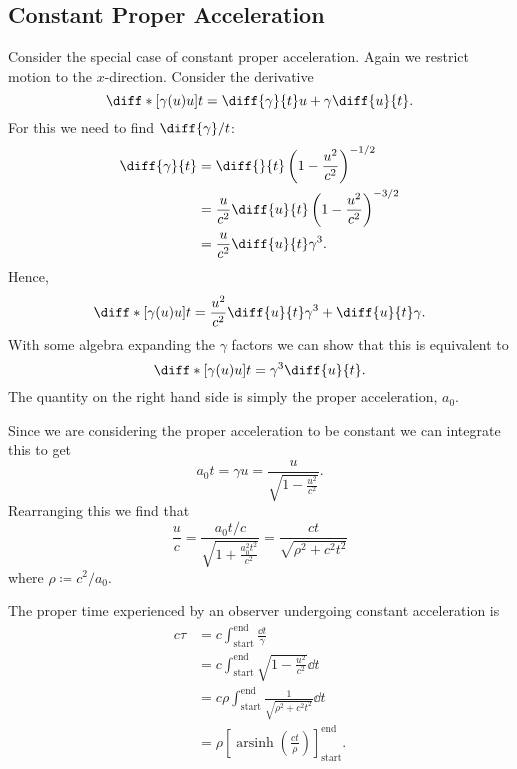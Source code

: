 \documentclass[fleqn]{NotesClass}
\DeclareMathOperator{\arsinh}{arsinh}
\begin{document}
    \subsection{Constant Proper Acceleration}
    Consider the special case of constant proper acceleration.
    Again we restrict motion to the \(x\)-direction.
    Consider the derivative
    \begin{equation}
        \diff*{[\gamma(u)u]}{t} = \diff{\gamma}{t}u + \gamma\diff{u}{t}.
    \end{equation}
    For this we need to find \(\diff{\gamma}/{t}\):
    \begin{align}
        \diff{\gamma}{t} &= \diff{}{t} \left( 1 - \frac{u^2}{c^2} \right)^{-1/2}\\
        &= \frac{u}{c^2}\diff{u}{t}\left( 1 - \frac{u^2}{c^2} \right)^{-3/2}\\
        &= \frac{u}{c^2}\diff{u}{t} \gamma^{3}.\label{eqn:d gamma/dt}
    \end{align}
    Hence,
    \begin{equation}
        \diff*{[\gamma(u)u]}{t} = \frac{u^2}{c^2}\diff{u}{t}\gamma^3 + \diff{u}{t}\gamma.
    \end{equation}
    With some algebra expanding the \(\gamma\) factors we can show that this is equivalent to
    \begin{equation}
        \diff*{[\gamma(u)u]}{t} = \gamma^3\diff{u}{t}.
    \end{equation}
    The quantity on the right hand side is simply the proper acceleration, \(a_0\).
    
    Since we are considering the proper acceleration to be constant we can integrate this to get
    \begin{equation}
        a_0t = \gamma u = \frac{u}{\sqrt{1 - \frac{u^2}{c^2}}}.
    \end{equation}
    Rearranging this we find that
    \begin{equation}
        \frac{u}{c} = \frac{a_0t/c}{\sqrt{1 + \frac{a_0^2t^2}{c^2}}} = \frac{ct}{\sqrt{\rho^2 + c^2t^2}}
    \end{equation}
    where \(\rho \coloneqq c^2/a_0\).
    
    The proper time experienced by an observer undergoing constant acceleration is
    \begin{align}
        c\tau &= c \int_{\text{start}}^{\text{end}} \frac{\dd{t}}{\gamma}\\
        &= c \int_{\text{start}}^{\text{end}} \sqrt{1 - \frac{u^2}{c^2}}\dd{t}\\
        &= c\rho \int_{\text{start}}^{\text{end}} \frac{1}{\sqrt{\rho^2 + c^2t^2}} \dd{t}\\
        &= \rho \left[ \arsinh\left( \frac{ct}{\rho} \right) \right]_{\text{start}}^{\text{end}}.
    \end{align}
    
\end{document}
